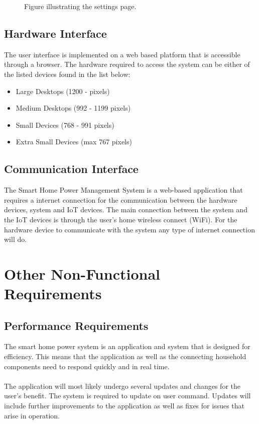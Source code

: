 \documentclass[11pt, a4paper]{article}
\begin{document}
\begin{itemize}
\begin{figure}[h!]
				\caption{Figure illustrating the settings page.}
				\label{Settings}
			\end{figure}
	\end{itemize}
	
	\pagebreak
	\subsection{Hardware Interface}
	The user interface is implemented on a web based platform that is accessible through a browser. The hardware required to access the system can be either of the listed devices found in the list below:
	
	\begin{itemize}
		\item Large Desktops (1200 -  pixels)
		\item Medium Desktops (992 - 1199 pixels)
		\item Small Devices (768 - 991 pixels)
		\item Extra Small Devices (max 767 pixels)
	\end{itemize}
	
	\subsection{Communication Interface}
	The Smart Home Power Management System is a web-based application that requires a internet connection for the communication between the hardware devices, system and IoT devices. The main connection between the system and the IoT devices is through the user's home wireless connect (WiFi). For the hardware device to communicate with the system any type of internet connection will do.
	
	\section{Other Non-Functional Requirements}
	
	\subsection{Performance Requirements}
	The smart home power system is an application and system that is designed for efficiency. This means that the application as well as the connecting household components need to respond quickly and in real time. 
	\\\\
	The application will most likely undergo several updates and changes for the user's benefit. The system is required to update on user command. Updates will include further improvements to the application as well as fixes for issues that arise in operation.
	
\end{document}
